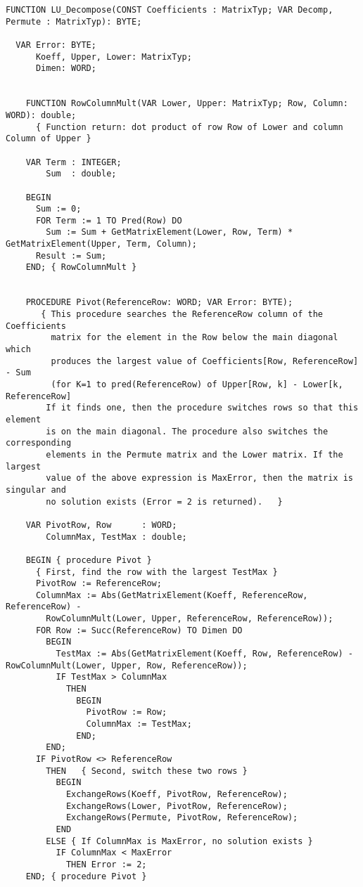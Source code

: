 \begin{lstlisting}[caption=LU-decomposition]
  FUNCTION LU_Decompose(CONST Coefficients : MatrixTyp; VAR Decomp, Permute : MatrixTyp): BYTE;

  VAR Error: BYTE;
      Koeff, Upper, Lower: MatrixTyp;
      Dimen: WORD;


    FUNCTION RowColumnMult(VAR Lower, Upper: MatrixTyp; Row, Column: WORD): double;
      { Function return: dot product of row Row of Lower and column Column of Upper }

    VAR Term : INTEGER;
        Sum  : double;

    BEGIN
      Sum := 0;
      FOR Term := 1 TO Pred(Row) DO
        Sum := Sum + GetMatrixElement(Lower, Row, Term) * GetMatrixElement(Upper, Term, Column);
      Result := Sum;
    END; { RowColumnMult }


    PROCEDURE Pivot(ReferenceRow: WORD; VAR Error: BYTE);
       { This procedure searches the ReferenceRow column of the Coefficients
         matrix for the element in the Row below the main diagonal which
         produces the largest value of Coefficients[Row, ReferenceRow] - Sum
         (for K=1 to pred(ReferenceRow) of Upper[Row, k] - Lower[k, ReferenceRow]
        If it finds one, then the procedure switches rows so that this element
        is on the main diagonal. The procedure also switches the corresponding
        elements in the Permute matrix and the Lower matrix. If the largest
        value of the above expression is MaxError, then the matrix is singular and
        no solution exists (Error = 2 is returned).   }

    VAR PivotRow, Row      : WORD;
        ColumnMax, TestMax : double;

    BEGIN { procedure Pivot }
      { First, find the row with the largest TestMax }
      PivotRow := ReferenceRow;
      ColumnMax := Abs(GetMatrixElement(Koeff, ReferenceRow, ReferenceRow) -
        RowColumnMult(Lower, Upper, ReferenceRow, ReferenceRow));
      FOR Row := Succ(ReferenceRow) TO Dimen DO
        BEGIN
          TestMax := Abs(GetMatrixElement(Koeff, Row, ReferenceRow) - RowColumnMult(Lower, Upper, Row, ReferenceRow));
          IF TestMax > ColumnMax
            THEN
              BEGIN
                PivotRow := Row;
                ColumnMax := TestMax;
              END;
        END;
      IF PivotRow <> ReferenceRow
        THEN   { Second, switch these two rows }
          BEGIN
            ExchangeRows(Koeff, PivotRow, ReferenceRow);
            ExchangeRows(Lower, PivotRow, ReferenceRow);
            ExchangeRows(Permute, PivotRow, ReferenceRow);
          END
        ELSE { If ColumnMax is MaxError, no solution exists }
          IF ColumnMax < MaxError
            THEN Error := 2;
    END; { procedure Pivot }



\end{lstlisting}
